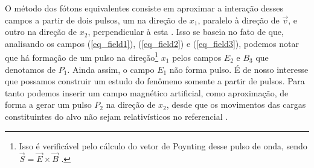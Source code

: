 O método dos fótons equivalentes consiste em aproximar a interação desses
campos a partir de dois pulsos, um na direção de $x_1$, paralelo à direção de
$\vec{v}$, e outro na direção de $x_2$, perpendicular à esta
\cite{caruso_quanta}. Isso se baseia no fato de que, analisando os campos
(\ref{eq_field1}), (\ref{eq_field2}) e (\ref{eq_field3}), podemos notar que há
formação de um pulso na direção\footnote{Isso é verificável pelo cálculo do
vetor de Poynting desse pulso de onda, sendo $\vec{S} = \vec{E}\times \vec{B}$
\cite{jackson3}.} $x_1$ pelos campos $E_2$ e $B_3$ que denotamos de $P_1$.
Ainda assim, o campo $E_1$ não forma pulso. É de nosso interesse que possamos
construir um estudo do fenômeno somente a partir de pulsos. Para tanto podemos
inserir um campo magnético artificial, como aproximação, de forma a gerar um
pulso $P_2$ na direção de $x_2$, desde que os movimentos das cargas
constituintes do alvo não sejam relativísticos no referencial \cite{jackson3}.

